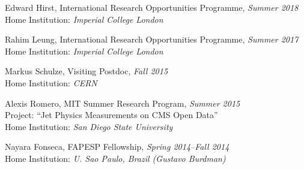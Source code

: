 \item Edward Hirst, International Research Opportunities Programme, \emph{Summer 2018}
\\ Home Institution: \emph{Imperial College London}

\item Rahim Leung, International Research Opportunities Programme, \emph{Summer 2017}
\\ Home Institution: \emph{Imperial College London}

\item Markus Schulze, Visiting Postdoc, \emph{Fall 2015}
\\ Home Institution: \emph{CERN}

\item Alexis Romero, MIT Summer Research Program, \emph{Summer 2015}
\\ Project: ``Jet Physics Measurements on CMS Open Data''
\\ Home Institution: \emph{San Diego State University}

\item Nayara Fonseca, FAPESP Fellowship, \emph{Spring 2014--Fall 2014}
\\ Home Institution: \emph{U. Sao Paulo, Brazil (Gustavo Burdman)}

\el
